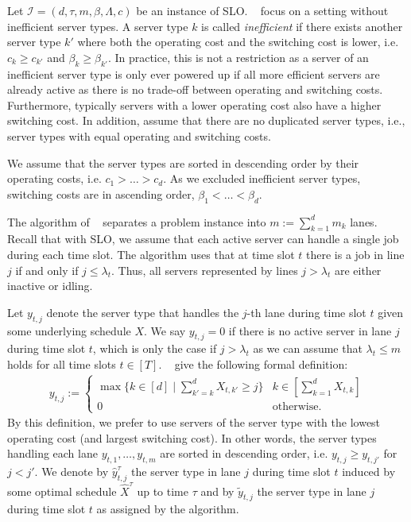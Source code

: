 Let $\mathcal{I} = (d, \tau, m, \beta, \Lambda, c)$ be an instance of SLO. \citeauthor*{Albers2021}~\cite{Albers2021} focus on a setting without inefficient server types. A server type $k$ is called \emph{inefficient} if there exists another server type $k'$ where both the operating cost and the switching cost is lower, i.e. $c_k \geq c_{k'}$ and $\beta_k \geq \beta_{k'}$. In practice, this is not a restriction as a server of an inefficient server type is only ever powered up if all more efficient servers are already active as there is no trade-off between operating and switching costs. Furthermore, typically servers with a lower operating cost also have a higher switching cost. In addition, \citeauthor*{Albers2021} assume that there are no duplicated server types, i.e., server types with equal operating and switching costs.

We assume that the server types are sorted in descending order by their operating costs, i.e. $c_1 > \dots > c_d$. As we excluded inefficient server types, switching costs are in ascending order, $\beta_1 < \dots < \beta_d$.

The algorithm of \citeauthor*{Albers2021}~\cite{Albers2021} separates a problem instance into $m := \sum_{k=1}^d m_k$ lanes. Recall that with SLO, we assume that each active server can handle a single job during each time slot. The algorithm uses that at time slot $t$ there is a job in line $j$ if and only if $j \leq \lambda_{t}$. Thus, all servers represented by lines $j > \lambda_{t}$ are either inactive or idling.

Let $y_{t,j}$ denote the server type that handles the $j$-th lane during time slot $t$ given some underlying schedule $X$. We say $y_{t,j} = 0$ if there is no active server in lane $j$ during time slot $t$, which is only the case if $j > \lambda_{t}$ as we can assume that $\lambda_{t} \leq m$ holds for all time slots $t \in [T]$. \citeauthor*{Albers2021}~\cite{Albers2021} give the following formal definition: \begin{align*}
    y_{t,j} := \begin{cases}
        \max \{k \in [d] \mid \sum_{k' = k}^d X_{t,k'} \geq j\} & k \in \left[\sum_{k=1}^d X_{t,k}\right] \\
        0 & \text{otherwise}.
    \end{cases}
\end{align*} By this definition, we prefer to use servers of the server type with the lowest operating cost (and largest switching cost). In other words, the server types handling each lane $y_{t,1}, \dots, y_{t,m}$ are sorted in descending order, i.e. $y_{t,j} \geq y_{t,j'}$ for $j < j'$. We denote by $\hat{y}_{t,j}^{\tau}$ the server type in lane $j$ during time slot $t$ induced by some optimal schedule $\hat{X}^{\tau}$ up to time $\tau$ and by $\widetilde{y}_{t,j}$ the server type in lane $j$ during time slot $t$ as assigned by the algorithm.

